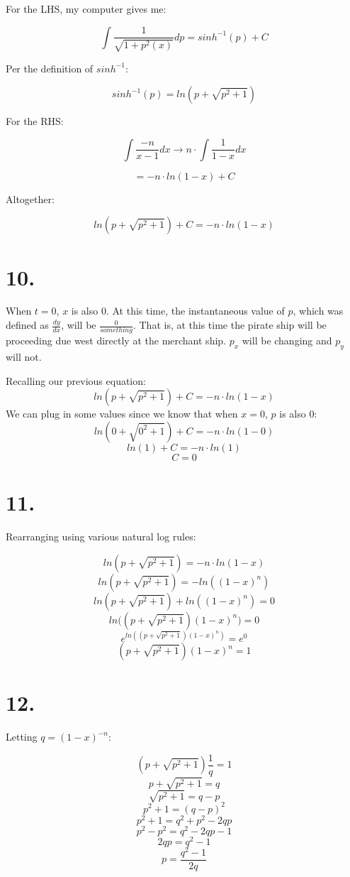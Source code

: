 \documentclass[11pt]{report}
\begin{document}
For the LHS, my computer gives me:

$$
\int \frac{1}{\sqrt{1 + p^2(x)}} dp
=
sinh^{-1}(p) + C
$$

Per the definition of $sinh^{-1}$:

$$
sinh^{-1}(p) = ln(p + \sqrt{p^2 + 1})
$$

For the RHS:

$$
\int \frac{-n}{x-1} dx
\rightarrow
n \cdot \int \frac{1}{1-x} dx
$$

$$ = -n \cdot ln(1-x) + C $$

Altogether:

$$
ln(p + \sqrt{p^2 + 1}) + C
=
-n \cdot ln(1-x)
$$

\section*{10.}

When $t=0$, $x$ is also $0$. At this time, the instantaneous value of $p$, which was
defined as $\frac{dy}{dx}$, will be $\frac{0}{something}$. That is, at this time
the pirate ship will be proceeding due west directly at the merchant ship.
$p_x$ will be changing and $p_y$ will not.

Recalling our previous equation:
$$
ln(p + \sqrt{p^2 + 1}) + C
=
-n \cdot ln(1-x)
$$
We can plug in some values since we know that when $x=0$, $p$ is also $0$:
$$
ln(0 + \sqrt{0^2 + 1}) + C
=
-n \cdot ln(1-0)
$$
$$ ln(1) + C = -n \cdot ln(1) $$
$$ C = 0 $$

\section*{11.}

Rearranging using various natural log rules:

$$ ln(p + \sqrt{p^2 + 1}) = -n \cdot ln(1-x) $$
$$ ln(p + \sqrt{p^2 + 1}) = -ln((1-x)^n) $$
$$ ln(p + \sqrt{p^2 + 1}) + ln((1-x)^n) = 0 $$
$$ ln\Big((p + \sqrt{p^2 + 1}) (1-x)^n \Big) = 0 $$
$$ e^{ln((p + \sqrt{p^2 + 1}) (1-x)^n )} = e^0 $$
$$(p + \sqrt{p^2 + 1}) (1-x)^n = 1$$

\section*{12.}

Letting $q=(1-x)^{-n}$:

$$(p + \sqrt{p^2 + 1}) \frac{1}{q} = 1$$
$$p + \sqrt{p^2 + 1} = q$$
$$\sqrt{p^2 + 1} = q - p$$
$$p^2 + 1 = (q - p)^2$$
$$p^2 + 1 = q^2 + p^2 - 2qp$$
$$p^2 - p^2 = q^2 - 2qp - 1$$
$$2qp = q^2 - 1$$
$$p = \frac{q^2 - 1}{2q}$$
\end{document}
